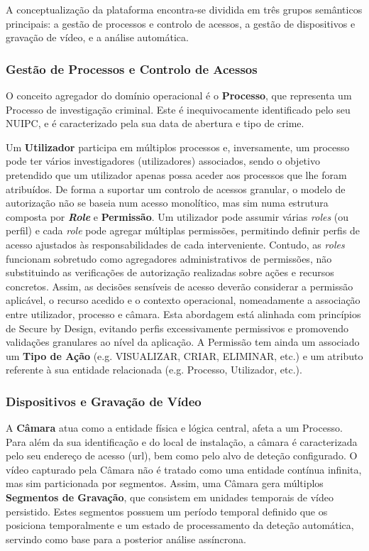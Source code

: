 A conceptualização da plataforma encontra-se dividida em três grupos semânticos principais: a gestão de processos e controlo de acessos, a gestão de dispositivos e gravação de vídeo, e a análise automática.

\subsubsection{Gestão de Processos e Controlo de Acessos}
O conceito agregador do domínio operacional é o \textbf{Processo}, que representa um Processo de investigação criminal. Este é inequivocamente identificado pelo seu \gls{NUIPC}, e é caracterizado pela sua data de abertura e tipo de crime.

Um \textbf{Utilizador} participa em múltiplos processos e, inversamente, um processo pode ter vários investigadores (utilizadores) associados, sendo o objetivo pretendido que um utilizador apenas possa aceder aos processos que lhe foram atribuídos. De forma a suportar um controlo de acessos granular, o modelo de autorização não se baseia num acesso monolítico, mas sim numa estrutura composta por \textit{\textbf{Role}} e \textbf{Permissão}. Um utilizador pode assumir várias \textit{roles} (ou perfil) e cada \textit{role} pode agregar múltiplas permissões, permitindo definir perfis de acesso ajustados às responsabilidades de cada interveniente. Contudo, as \textit{roles} funcionam sobretudo como agregadores administrativos de permissões, não substituindo as verificações de autorização realizadas sobre ações e recursos concretos. Assim, as decisões sensíveis de acesso deverão considerar a permissão aplicável, o recurso acedido e o contexto operacional, nomeadamente a associação entre utilizador, processo e câmara. Esta abordagem está alinhada com princípios de Secure by Design, evitando perfis excessivamente permissivos e promovendo validações granulares ao nível da aplicação. A Permissão tem ainda um associado um \textbf{Tipo de Ação} (e.g. VISUALIZAR, CRIAR, ELIMINAR, etc.) e um atributo referente à sua entidade relacionada (e.g. Processo, Utilizador, etc.).

\subsubsection{Dispositivos e Gravação de Vídeo}
A \textbf{Câmara} atua como a entidade física e lógica central, afeta a um Processo. Para além da sua identificação e do local de instalação, a câmara é caracterizada pelo seu endereço de acesso (url), bem como pelo alvo de deteção configurado.
O vídeo capturado pela Câmara não é tratado como uma entidade contínua infinita, mas sim particionada por segmentos. Assim, uma Câmara gera múltiplos \textbf{Segmentos de Gravação}, que consistem em unidades temporais de vídeo persistido. Estes segmentos possuem um período temporal definido que os posiciona temporalmente e um estado de processamento da deteção automática, servindo como base para a posterior análise assíncrona.

